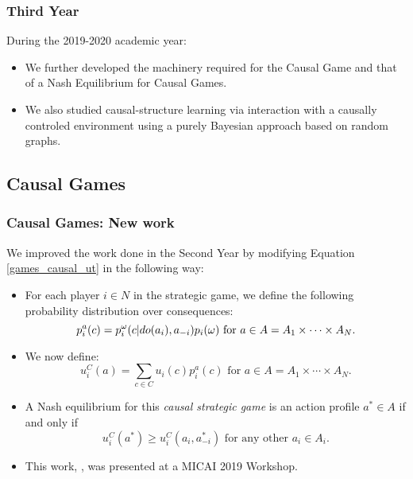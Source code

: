 \documentclass{beamer}
\theoremstyle{plain}
\begin{document}
\begin{frame}
\frametitle{Third Year}
During the 2019-2020 academic year:
\begin{itemize}
\item We further developed the machinery required for the Causal Game and that of a Nash Equilibrium for Causal Games.
\item We also studied causal-structure learning via interaction with a causally controled environment using a purely Bayesian approach based on random graphs.
\end{itemize}
\end{frame}

\subsection{Causal Games}
\begin{frame}
\frametitle{Causal Games: New work}
We improved the work done in the Second Year by modifying Equation \ref{games_causal_ut} in the following way:
\begin{itemize}
\item For each player $i \in N$ in the strategic game, we define the following probability distribution over consequences:
\begin{equation}{\label{causal_utility}}
p^a_i (c) =  p^\omega_i (c | do(a_i), a_{-i}) p_i(\omega)\textrm{ for } a \in A=A_1 \times \cdots \times A_N.
\end{equation}
\item We now define:
\begin{equation}
u^C_i (a) = \sum_{c \in C}  u_i(c) p^a_i (c) \textrm{ for } a \in A=A_1 \times \cdots \times A_N.
\end{equation}
\item A Nash equilibrium for this \textit{causal strategic game} is an action profile $a^\ast \in A$ if and only if
\begin{equation}
 u^C_i(a^\ast) \geq u^C_i(a_i, a^\ast_{-i}) \textrm{ for any other } a_i \in A_i. 
 \end{equation}
\item This work, \cite{gonzalez2019games}, was presented at a MICAI 2019 Workshop.
\end{itemize}
\end{frame}
\end{document}
